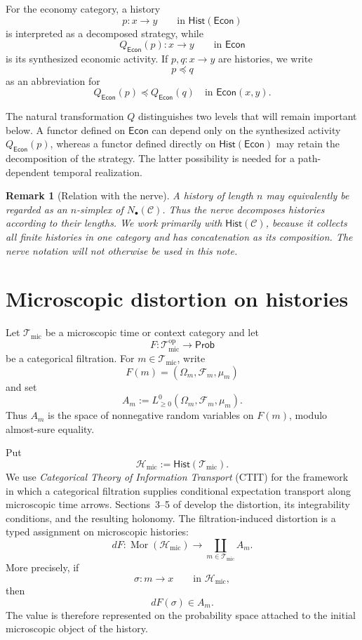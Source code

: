 \documentclass[11pt,a4paper]{article}
\newtheorem{remark}[definition]{Remark}
\newcommand{\Econ}{\mathsf{Econ}}
\newcommand{\Prob}{\mathsf{Prob}}
\newcommand{\Hist}{\mathsf{Hist}}
\newcommand{\Tmic}{\mathcal T_{\mathrm{mic}}}
\newcommand{\Hmic}{\mathcal H_{\mathrm{mic}}}
\begin{document}
For the economy category, a history
\[
  p:x\longrightarrow y
  \qquad\text{in }\Hist(\Econ)
\]
is interpreted as a decomposed strategy, while
\[
  Q_{\Econ}(p):x\longrightarrow y
  \qquad\text{in }\Econ
\]
is its synthesized economic activity. If \(p,q:x\to y\) are histories, we
write
\[
  p\preceq q
\]
as an abbreviation for
\[
  Q_{\Econ}(p)\preceq Q_{\Econ}(q)
  \quad\text{in }\Econ(x,y).
\]

The natural transformation \(Q\) distinguishes two levels that will remain
important below.  A functor defined on \(\Econ\) can depend only on the
synthesized activity \(Q_{\Econ}(p)\), whereas a functor defined directly on
\(\Hist(\Econ)\) may retain the decomposition of the strategy.  The latter
possibility is needed for a path-dependent temporal realization.

\begin{remark}[Relation with the nerve]
A history of length \(n\) may equivalently be regarded as an \(n\)-simplex
of \(N_\bullet(\mathcal C)\). Thus the nerve decomposes histories according
to their lengths. We work primarily with \(\Hist(\mathcal C)\), because it
collects all finite histories in one category and has concatenation as its
composition. The nerve notation will not otherwise be used in this note.
\end{remark}


\section{Microscopic distortion on histories}
\label{sec:microscopic-distortion}

Let \(\Tmic\) be a microscopic time or context category and let
\[
  F:\Tmic^{\mathrm{op}}\longrightarrow\Prob
\]
be a categorical filtration. For \(m\in\Tmic\), write
\[
  F(m)=(\Omega_m,\mathcal F_m,\mu_m)
\]
and set
\[
  A_m:=L^0_{\geq0}(\Omega_m,\mathcal F_m,\mu_m).
\]
Thus \(A_m\) is the space of nonnegative random variables on \(F(m)\),
modulo almost-sure equality.

Put
\[
  \Hmic:=\Hist(\Tmic).
\]
We use \emph{Categorical Theory of Information Transport} (CTIT) for
the framework in which a categorical filtration supplies conditional
expectation transport along microscopic time arrows. Sections~3--5 of
\cite{AdachiHaraAB} develop the distortion, its integrability conditions,
and the resulting holonomy. The filtration-induced distortion is a typed
assignment on microscopic histories:
\[
  dF:
  \operatorname{Mor}(\Hmic)
  \longrightarrow
  \coprod_{m\in\Tmic}A_m.
  \tag{D}
\]
More precisely, if
\[
  \sigma:m\longrightarrow x
  \qquad\text{in }\Hmic,
\]
then
\[
  dF(\sigma)\in A_m.
  \tag{D1}
\]
The value is therefore represented on the probability space attached to the
initial microscopic object of the history.
\end{document}
